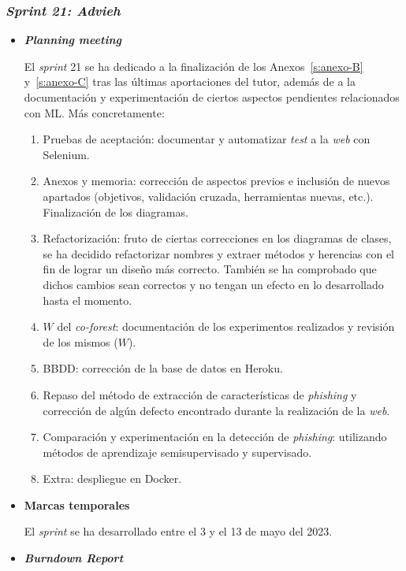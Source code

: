 \subsubsection{\textit{Sprint 21: Advieh}}
\begin{itemize}
	\item \textbf{\textit{Planning meeting}}
	
	El \textit{sprint} 21 se ha dedicado a la finalización de los Anexos~\ref{s:anexo-B} y~\ref{s:anexo-C} tras las últimas aportaciones del tutor, además de a la documentación y experimentación de ciertos aspectos pendientes relacionados con ML. Más concretamente:
	
	\begin{enumerate}
		\item Pruebas de aceptación: documentar y automatizar \textit{test} a la \textit{web} con Selenium.
		\item Anexos y memoria: corrección de aspectos previos e inclusión de nuevos apartados (objetivos, validación cruzada, herramientas nuevas, etc.). Finalización de los diagramas.
		\item Refactorización: fruto de ciertas correcciones en los diagramas de clases, se ha decidido refactorizar nombres y extraer métodos y herencias con el fin de lograr un diseño más correcto. También se ha comprobado que dichos cambios sean correctos y no tengan un efecto en lo desarrollado hasta el momento.
		\item $W$ del \textit{co-forest}: documentación de los experimentos realizados y revisión de los mismos ($W$).
		\item BBDD: corrección de la base de datos en Heroku.
		\item Repaso del método de extracción de características de \textit{phishing} y corrección de algún defecto encontrado durante la realización de la \textit{web}.
		\item Comparación y experimentación en la detección de \textit{phishing}: utilizando métodos de aprendizaje semisupervisado y supervisado.
		\item Extra: despliegue en Docker.

		
	\end{enumerate}
	\item \textbf{Marcas temporales}		
	
	El \textit{sprint} se ha desarrollado entre el 3 y el 13 de mayo del 2023.
	
	\item \textbf{\textit{Burndown Report}}
	

\end{itemize}
